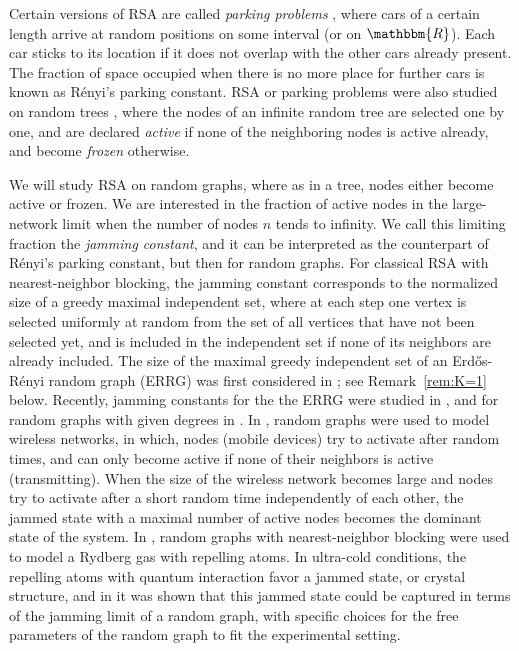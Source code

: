 \documentclass[11pt,a4paper, reqno]{article}
\begin{document}
Certain versions of RSA are called \emph{parking problems} \cite{R58}, where cars of a certain length arrive at random positions on some interval (or on ${\mathbbm{R}}$). Each car sticks to its location if it does not overlap with the other cars already present.
The fraction of space occupied when there is no more place for further cars is known as R\'enyi's parking constant.
RSA or parking problems were also studied on random trees \cite{DFK08, S09}, where the nodes of an infinite random tree are selected one by one, and are declared {\it active} if none of the neighboring nodes is active already, and become {\it frozen} otherwise.

We will study RSA on random graphs, where as in a tree, nodes either become active or frozen. We are interested in the
fraction of active nodes in the large-network limit when the number of nodes $n$ tends to infinity. We call this limiting fraction the {\it jamming constant}, and it can be interpreted as the counterpart of  R\'enyi's parking constant, but then for random graphs.
For classical RSA with nearest-neighbor blocking, the jamming constant corresponds to the normalized size of a greedy maximal independent set, where at each step one vertex is selected uniformly at random from the set of all vertices that have not been selected yet, and is included in the independent set if none of its neighbors are already included.
The size of the maximal greedy independent set of an Erd\H{o}s-R\'enyi random graph (ERRG) was first considered in \cite{M84}; see Remark~\ref{rem:K=1} below.
Recently, jamming constants for the the ERRG were studied in \cite{BJS15, SJK15}, and for random graphs with given degrees in \cite{BJM13, BJLM14, BJL15}. 
In \cite{BJLM14}, random graphs were used to model wireless networks, in which, nodes (mobile devices) try to activate after random times, and can only become active if none of their neighbors is active (transmitting).
When the size of the wireless network becomes large and nodes try to activate after a short random time independently of each other, the jammed state with a maximal number of active nodes becomes the dominant state of the system. In \cite{SJK15}, random graphs with nearest-neighbor blocking were used to model a Rydberg gas with repelling atoms. In ultra-cold conditions, the repelling atoms with quantum interaction favor a jammed state, or crystal structure, and in \cite{SJK15} it was shown that this jammed state could be captured in terms of the jamming limit of a random graph, with specific choices for the free parameters of the random graph to fit the experimental setting.
\end{document}
